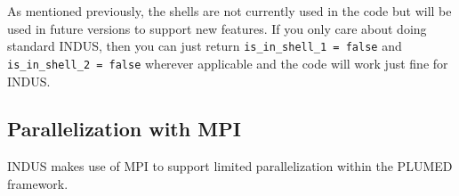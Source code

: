 \documentclass[11pt,notitlepage]{article}
\begin{document}

As mentioned previously, the shells are not currently used in the code but will be used in future versions to support new features. If you only care about doing standard INDUS, then you can just return \texttt{is\_in\_shell\_1 = false} and \texttt{is\_in\_shell\_2 = false} wherever applicable and the code will work just fine for INDUS.


\subsection{Parallelization with MPI}

INDUS makes use of MPI to support limited parallelization within the PLUMED framework.








\end{document}
